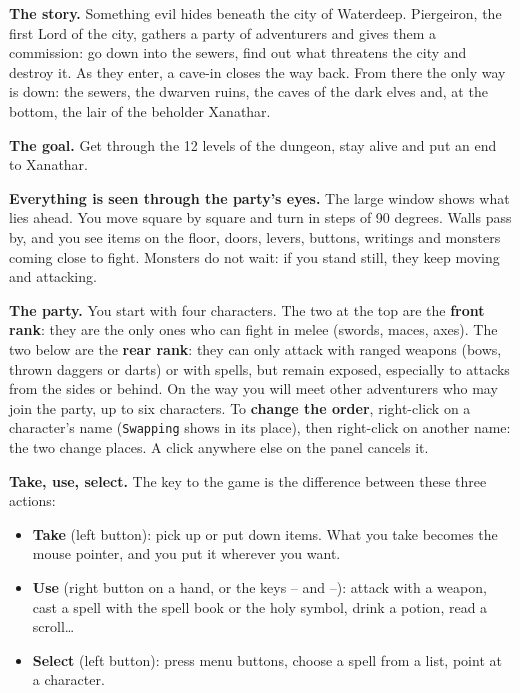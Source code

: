 

\textbf{The story.} Something evil hides beneath the city of Waterdeep. Piergeiron, the first Lord of the city, gathers a party of adventurers and gives them a commission: go down into the sewers, find out what threatens the city and destroy it. As they enter, a cave-in closes the way back. From there the only way is down: the sewers, the dwarven ruins, the caves of the dark elves and, at the bottom, the lair of the beholder Xanathar.

\textbf{The goal.} Get through the 12 levels of the dungeon, stay alive and put an end to Xanathar.

\textbf{Everything is seen through the party's eyes.} The large window shows what lies ahead. You move square by square and turn in steps of 90 degrees. Walls pass by, and you see items on the floor, doors, levers, buttons, writings and monsters coming close to fight. Monsters do not wait: if you stand still, they keep moving and attacking.

\textbf{The party.} You start with four characters. The two at the top are the \textbf{front rank}: they are the only ones who can fight in melee (swords, maces, axes). The two below are the \textbf{rear rank}: they can only attack with ranged weapons (bows, thrown daggers or darts) or with spells, but remain exposed, especially to attacks from the sides or behind. On the way you will meet other adventurers who may join the party, up to six characters. To \textbf{change the order}, right-click on a character's name (\texttt{Swapping} shows in its place), then right-click on another name: the two change places. A click anywhere else on the panel cancels it.

\textbf{Take, use, select.} The key to the game is the difference between these three actions:
\begin{itemize}
\item \textbf{Take} (left button): pick up or put down items. What you take becomes the mouse pointer, and you put it wherever you want.
\item \textbf{Use} (right button on a hand, or the keys -- and --): attack with a weapon, cast a spell with the spell book or the holy symbol, drink a potion, read a scroll\dots
\item \textbf{Select} (left button): press menu buttons, choose a spell from a list, point at a character.
\end{itemize}

